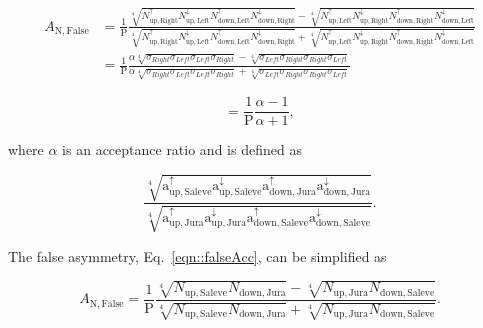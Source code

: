 \begin{equation}
  \label{eqn::falseAcc}
  \begin{split}
    A_{\mathrm{N,False}} &= 
    \frac{1}{\mathrm{P}}
    \frac{
      \sqrt[4]{
        N_{\mathrm{up,Right}}^{\uparrow}N_{\mathrm{up, Left}}^{\downarrow}
        N_{\mathrm{down,Left}}^{\uparrow}N_{\mathrm{down, Right}}^{\downarrow}
      } -
      \sqrt[4]{
        N_{\mathrm{up,Left}}^{\uparrow}N_{\mathrm{up, Right}}^{\downarrow}
        N_{\mathrm{down,Right}}^{\uparrow}N_{\mathrm{down, Left}}^{\downarrow}
      }
    }{
      \sqrt[4]{
        N_{\mathrm{up,Right}}^{\uparrow}N_{\mathrm{up, Left}}^{\downarrow}
        N_{\mathrm{down,Left}}^{\uparrow}N_{\mathrm{down, Right}}^{\downarrow}
      } +
      \sqrt[4]{
        N_{\mathrm{up,Left}}^{\uparrow}N_{\mathrm{up, Right}}^{\downarrow}
        N_{\mathrm{down,Right}}^{\uparrow}N_{\mathrm{down, Left}}^{\downarrow}
      }
    }\\
    & =
    \frac{1}{\mathrm{P}}
    \frac{
      \alpha \sqrt[4]{\sigma_{Right}\sigma_{Left}\sigma_{Left}\sigma_{Right}} -
      \sqrt[4]{\sigma_{Left}\sigma_{Right}\sigma_{Right}\sigma_{Left}}
    }{
      \alpha \sqrt[4]{\sigma_{Right}\sigma_{Left}\sigma_{Left}\sigma_{Right}} +
      \sqrt[4]{\sigma_{Left}\sigma_{Right}\sigma_{Right}\sigma_{Left}}
    }
  \end{split}
\end{equation}

\begin{equation}
  \label{equ::alphaAsym}
  = \frac{1}{\mathrm{P}}
  \frac{
    \alpha - 1     
  }{
    \alpha + 1
  },
\end{equation}

\noindent
where $\alpha$ is an acceptance ratio and is defined as

\begin{equation}
  \frac{
    \sqrt[4]{
      \mathrm{a}^{\uparrow}_{\mathrm{up,Saleve}}
      \mathrm{a}^{\downarrow}_{\mathrm{up,Saleve}}
      \mathrm{a}^{\uparrow}_{\mathrm{down,Jura}}
      \mathrm{a}^{\downarrow}_{\mathrm{down,Jura}}}
  }{
    \sqrt[4]{
      \mathrm{a}^{\uparrow}_{\mathrm{up,Jura}}
      \mathrm{a}^{\downarrow}_{\mathrm{up,Jura}}
      \mathrm{a}^{\uparrow}_{\mathrm{down,Saleve}}
      \mathrm{a}^{\downarrow}_{\mathrm{down,Saleve}}}
  }.
\end{equation}

\noindent
The false asymmetry, Eq.~\ref{eqn::falseAcc}, can be simplified as

\begin{equation}
  A_{\mathrm{N,False}} = 
  \frac{1}{\mathrm{P}}
  \frac{
    \sqrt[4]{
      N_{\mathrm{up, Saleve}}
      N_{\mathrm{down, Jura}}
    } -
    \sqrt[4]{
      N_{\mathrm{up, Jura}}
      N_{\mathrm{down, Saleve}}
    }
  }{
    \sqrt[4]{
      N_{\mathrm{up, Saleve}}
      N_{\mathrm{down, Jura}}
    } +
    \sqrt[4]{
      N_{\mathrm{up, Jura}}
      N_{\mathrm{down, Saleve}}
    }
  }.
\end{equation}

